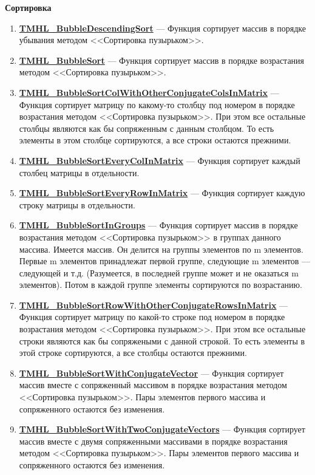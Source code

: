 \documentclass[a4paper,12pt]{article}
\begin{document}
\textbf{Сортировка}
\begin{enumerate}

\item \textbf{\hyperref[TMHL_BubbleDescendingSort]{TMHL\_BubbleDescendingSort}} --- Функция сортирует массив в порядке убывания методом <<Сортировка пузырьком>>.

\item \textbf{\hyperref[TMHL_BubbleSort]{TMHL\_BubbleSort}} --- Функция сортирует массив в порядке возрастания методом <<Сортировка пузырьком>>.

\item \textbf{\hyperref[TMHL_BubbleSortColWithOtherConjugateColsInMatrix]{TMHL\_BubbleSortColWithOtherConjugateColsInMatrix}} --- Функция сортирует матрицу по какому-то столбцу под номером в порядке возрастания методом <<Сортировка пузырьком>>. При этом все остальные столбцы являются как бы сопряженным с данным столбцом. То есть элементы в этом столбце сортируются, а все строки остаются прежними.

\item \textbf{\hyperref[TMHL_BubbleSortEveryColInMatrix]{TMHL\_BubbleSortEveryColInMatrix}} --- Функция сортирует каждый столбец матрицы в отдельности.

\item \textbf{\hyperref[TMHL_BubbleSortEveryRowInMatrix]{TMHL\_BubbleSortEveryRowInMatrix}} --- Функция сортирует каждую строку матрицы в отдельности.

\item \textbf{\hyperref[TMHL_BubbleSortInGroups]{TMHL\_BubbleSortInGroups}} --- Функция сортирует массив в порядке возрастания методом <<Сортировка пузырьком>> в группах данного массива. Имеется массив. Он делится на группы элементов по m элементов. Первые m элементов принадлежат первой группе, следующие m элементов --- следующей и т.д. (Разумеется, в последней группе может и не оказаться m элементов). Потом в каждой группе элементы сортируются по возрастанию.

\item \textbf{\hyperref[TMHL_BubbleSortRowWithOtherConjugateRowsInMatrix]{TMHL\_BubbleSortRowWithOtherConjugateRowsInMatrix}} --- Функция сортирует матрицу по какой-то строке под номером в порядке возрастания методом <<Сортировка пузырьком>>. При этом все остальные строки являются как бы сопряжеными с данной строкой. То есть элементы в этой строке сортируются, а все столбцы остаются прежними.

\item \textbf{\hyperref[TMHL_BubbleSortWithConjugateVector]{TMHL\_BubbleSortWithConjugateVector}} --- Функция сортирует массив вместе с сопряженный массивом в порядке возрастания методом <<Сортировка пузырьком>>. Пары элементов первого массива и сопряженного остаются без изменения.

\item \textbf{\hyperref[TMHL_BubbleSortWithTwoConjugateVectors]{TMHL\_BubbleSortWithTwoConjugateVectors}} --- Функция сортирует массив вместе с двумя сопряженными массивами в порядке возрастания методом <<Сортировка пузырьком>>. Пары элементов первого массива и сопряженного остаются без изменения.

\end{enumerate}
\end{document}
